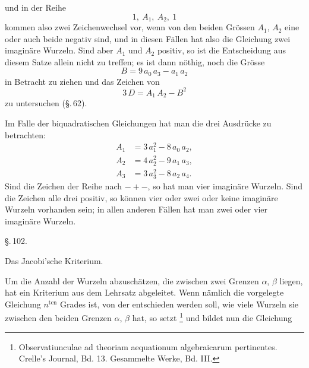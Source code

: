 und in der Reihe
\[
1,\ A_1,\ A_2,\ 1
\]
kommen also zwei Zeichenwechsel vor, wenn von den beiden Grössen $A_1$, $A_2$ eine oder auch beide negativ sind, und in diesen Fällen hat also die Gleichung zwei imaginäre Wurzeln. Sind aber $A_1$ und $A_2$ positiv, so ist die Entscheidung aus diesem Satze allein nicht zu treffen; es ist dann n\"othig, noch die Grösse
\[
B = 9\,a_0\,a_3 - a_1\,a_2
\]
in Betracht zu ziehen und das Zeichen von
\[
3\,D = A_1\,A_2 - B^2
\]
zu untersuchen (\S.\,62).

Im Falle der biquadratischen Gleichungen hat man die drei Ausdrücke zu betrachten:
\[
\begin{aligned}
A_1 &= 3\,a_1^2 - 8\,a_0\,a_2,\\
A_2 &= 4\,a_2^2 - 9\,a_1\,a_3,\\
A_3 &= 3\,a_3^2 - 8\,a_2\,a_4.
\end{aligned}
\]
Sind die Zeichen der Reihe nach $-+-$, so hat man vier imaginäre Wurzeln. Sind die Zeichen alle drei positiv, so können vier oder zwei oder keine imaginäre Wurzeln vorhanden sein; in allen anderen Fällen hat man zwei oder vier imaginäre Wurzeln.

\begin{center}
\S.\,102.

Das Jacobi'sche Kriterium.
\end{center}

Um die Anzahl der Wurzeln abzuschätzen, die zwischen zwei Grenzen $\alpha$, $\beta$ liegen, hat  ein Kriterium aus dem  Lehrsatz abgeleitet. Wenn nämlich
die vorgelegte Gleichung $n^{\mathrm{ten}}$ Grades ist, von der entschieden werden soll, wie viele Wurzeln sie zwischen den beiden Grenzen $\alpha$, $\beta$ hat, so setzt \footnote{Observatiunculae ad theoriam aequationum algebraicarum pertinentes. Crelle's Journal, Bd. 13. Gesammelte Werke, Bd. III.}
und bildet nun die Gleichung
